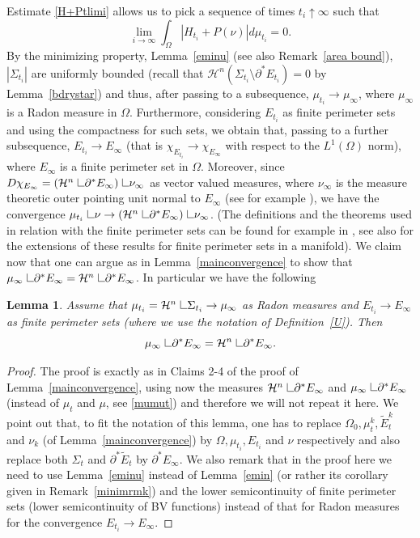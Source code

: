 \documentclass[11pt]{amsart}
\newtheorem{Lemma}[Theorem]{Lemma}
\def\H{\mathcal{H}}
\def\wt{\widetilde}
\def\res{\hbox{ {\vrule height .25cm}{\leaders\hrule\hskip.2cm}}\hskip5.0\mu}
\begin{document}
Estimate \eqref{H+Ptlimi} allows us to pick a sequence of times $t_i\uparrow \infty$ such that
\begin{equation}\label{to0}
\lim_{i\to\infty}\int_{\Omega}|H_{t_i}+P(\nu)|d\mu_{t_i}=0.
\end{equation}
By the minimizing property, Lemma~\ref{eminu} (see also Remark~\ref{area bound}), $|\Sigma_{t_i}|$ are uniformly bounded  (recall that $\H^n(\Sigma_{t_i}\setminus\partial^*E_{t_i})=0$ by Lemma~\ref{bdrystar}) and thus, after passing to a subsequence, $\mu_{t_i}\to \mu_\infty$, where $\mu_\infty$ is a Radon measure in $\Omega$. Furthermore, considering $E_{t_i}$ as finite perimeter sets and using the compactness for such sets, we obtain that, passing to a further subsequence, $E_{t_i}\to E_\infty$ (that is $\chi_{E_{t_i}}\to \chi_{E_\infty}$ with respect to the $L^1(\Omega)$ norm), where $E_\infty$ is a finite perimeter set in $\Omega$.
 Moreover, since $D\chi_{E_\infty}=(\H^{n}\res\partial^* E_\infty)\res \nu_\infty$ as vector valued measures, where $\nu_\infty$ is the measure theoretic outer pointing unit normal to $E_\infty$  (see for example \cite[Section 5.7]{EG92}), we have the convergence $\mu_{t_i}\res \nu\to(\H^n\res\partial^* E_\infty)\res\nu_\infty$. (The definitions and the theorems used in relation with the finite perimeter sets can be found for example in  \cite[Chapters 1 and 3]{Giu}, see also \cite{Alex} for the extensions of these results for finite perimeter sets in a manifold).  We claim now that one can argue as in Lemma~\ref{mainconvergence} to show that 
 $\mu_\infty\res\partial^*E_\infty=\H^n \res\partial^*E_\infty$. In particular we have the following
 \begin{Lemma}\label{mainconvII}
 Assume that $\mu_{t_i}=\H^n\res\Sigma_{t_i}\to\mu_\infty$ as Radon measures and $E_{t_i}\to E_\infty$ as finite perimeter sets (where we use the notation of Definition~\ref{U}). Then 
 \begin{equation}\label{muinfty}
\mu_\infty\res\partial^*E_\infty=\H^{n}\res \partial^* E_\infty.
\end{equation}
 \end{Lemma}
\begin{proof}
The proof is exactly as in  Claims 2-4 of the proof of Lemma~\ref{mainconvergence}, using now the measures  $\H^n\res\partial^*E_\infty$ and $\mu_\infty\res\partial^*E_\infty$ (instead of $\mu_t$ and $\mu$, see \eqref{mumut}) and therefore we will not repeat it here. We point out that, to fit the notation of this lemma, one has to replace  $\Omega_0, \mu_t^k, \wt E_t^k$ and $\nu_k$ (of Lemma~\ref{mainconvergence}) by $\Omega, \mu_{t_i}, E_{t_i}$ and $\nu$ respectively and also replace both $\Sigma_t$ and $\partial^*\wt E_t$ by $ \partial^* E_\infty$. We also remark that in the proof here we need to use Lemma~\ref{eminu} instead of Lemma~\ref{emin} (or rather its corollary given in Remark~\ref{minimrmk}) and the lower semicontinuity of finite perimeter sets (lower semicontinuity of BV functions) instead of that for Radon measures for the convergence $E_{t_i}\to E_\infty$.
\end{proof}
\end{document}
